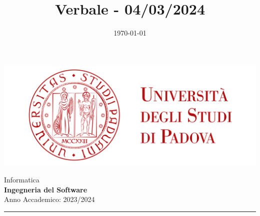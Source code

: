 \documentclass[5pt]{article}
\title{ Verbale - 04/03/2024 }
\date{\today}
\begin{document}


    \vspace{8pt}
    \includegraphics[scale=0.2]{UNIPDFull.png}

\vspace{10pt}

\begin{minipage}[t]{0.48\textwidth}
        \begin{flushleft}
            Informatica\\
            \vspace{5pt}
            \textbf{\LARGE Ingegneria del Software}\\
            Anno Accademico: 2023/2024
        \end{flushleft}
\end{minipage}


\vspace{5px}


\rule{\textwidth}{5pt}
\end{document}
